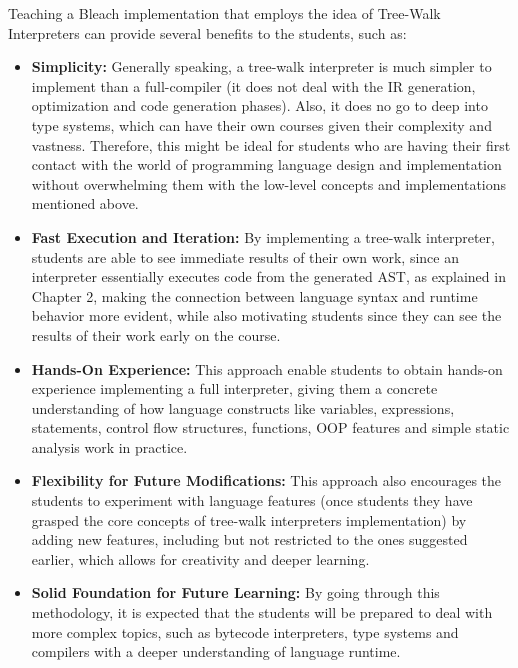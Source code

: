 Teaching a Bleach implementation that employs the idea of Tree-Walk Interpreters can provide several benefits to the students, such as:
\begin{itemize}
    \item \textbf{Simplicity:} Generally speaking, a tree-walk interpreter is much simpler to implement than a full-compiler (it does not deal with the IR generation, optimization and code generation phases). Also, it does no go to deep into type systems, which can have their own courses given their complexity and vastness. Therefore, this might be ideal for students who are having their first contact with the world of programming language design and implementation without overwhelming them with the low-level concepts and implementations mentioned above.
    
    \item \textbf{Fast Execution and Iteration:} By implementing a tree-walk interpreter, students are able to see immediate results of their own work, since an interpreter essentially executes code from the generated AST, as explained in Chapter 2, making the connection between language syntax and runtime behavior more evident, while also motivating students since they can see the results of their work early on the course.
    
    \item \textbf{Hands-On Experience:} This approach enable students to obtain hands-on experience implementing a full interpreter, giving them a concrete understanding of how language constructs like variables, expressions, statements, control flow structures, functions, OOP features and simple static analysis work in practice.
    
    \item \textbf{Flexibility for Future Modifications:} This approach also encourages the students to experiment with language features (once students they have grasped the core concepts of tree-walk interpreters implementation) by adding new features, including but not restricted to the ones suggested earlier, which allows for creativity and deeper learning.
    
    \item \textbf{Solid Foundation for Future Learning:} By going through this methodology, it is expected that the students will be prepared to deal with more complex topics, such as bytecode interpreters, type systems and compilers with a deeper understanding of language runtime.
\end{itemize}

